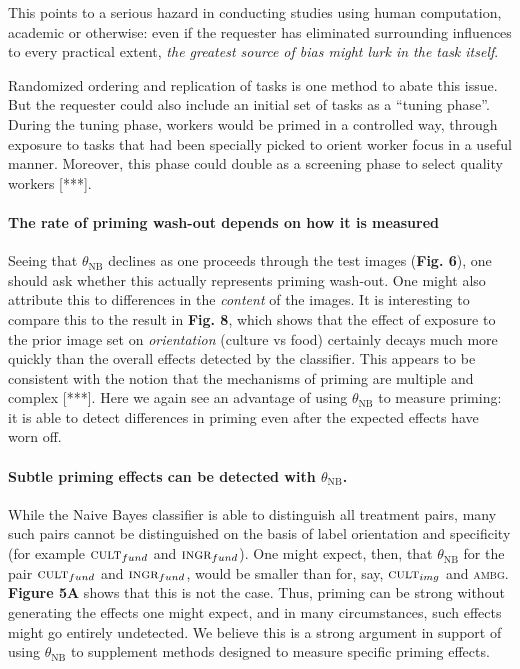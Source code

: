 \documentclass[a4paper]{report}
\begin{document}
This points to a serious hazard in conducting studies using human computation,
academic or otherwise: even if the requester has 
eliminated surrounding influences to every practical extent, 
\textit{the greatest source of bias might lurk in the task itself}.

Randomized ordering and replication of tasks is one method to abate this issue.
But the requester could also include an initial set of tasks as a 
``tuning phase''.  During the tuning phase, workers would be primed in a 
controlled way, through exposure to tasks that had been specially picked to
orient worker focus in a useful manner.  Moreover, this phase could double as a
screening phase to select quality workers [***].

\paragraph{The rate of priming wash-out depends on how it is measured}
Seeing that $\theta_\text{NB}$ declines as one proceeds through the test 
images (\textbf{Fig. 6}), one should ask whether this actually represents 
priming wash-out.  One might also attribute this to 
differences in the \textit{content} of the images. It is interesting to 
compare this to the result in \textbf{Fig. 8}, which
shows that the effect of exposure to the prior image set on 
\textit{orientation} (culture vs food) certainly
decays much more quickly than the overall effects detected by
the classifier.  This appears to be consistent with the notion that the 
mechanisms of priming are multiple and complex [***].  Here we again see an
advantage of using $\theta_\text{NB}$ to measure priming: it is able to detect 
differences in priming even after the expected effects have worn off.

\paragraph{Subtle priming effects can be detected with $\theta_\text{NB}$.}
While the Naive Bayes classifier is able to distinguish all treatment pairs,
many such pairs cannot be distinguished on the basis of label orientation and 
specificity 
(for example $\textsc{cult}_{fund}$ and $\textsc{ingr}_{fund}$).
One might expect, then, that $\theta_\text{NB}$
for the pair $\textsc{cult}_{fund}$ and $\textsc{ingr}_{fund}$, would be 
smaller than for, say, $\textsc{cult}_{img}$ and \textsc{ambg}.  
\textbf{Figure 5A} shows that this is not the case.  Thus, priming can be 
strong without generating the effects one might expect, and in many 
circumstances, such effects might go entirely undetected.  We believe this 
is a strong argument in support of using $\theta_\text{NB}$ to supplement 
methods designed to measure specific priming effects.
\end{document}
